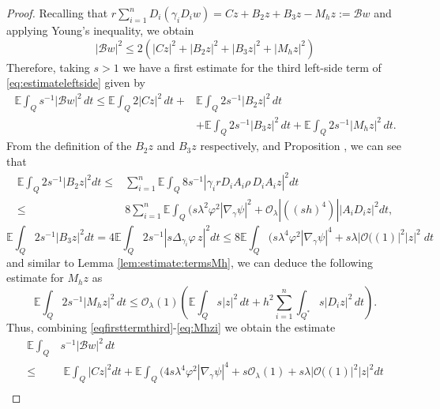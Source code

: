 \documentclass[11pt,oneside,leqno]{amsart}
\numberwithin{equation}{section}
\numberwithin{equation}{section}
\newcommand{\E}{\mathbb{E}}
\begin{document}
\begin{proof}
    Recalling that $\displaystyle r{ \sum_{i=1}^{n}}D_i(\gamma_iD_iw)=Cz+B_2z+B_3z-M_hz:= \mathcal{B}w$ and applying Young's inequality, we obtain
\begin{equation}
    |\mathcal{B}w|^2\leq  2(|Cz|^2+|B_2z|^2+|B_3z|^2+|M_hz|^2)
\end{equation}
Therefore, taking $s>1$ we have a first estimate for the third left-side term of \eqref{eq:estimateleftside} given by
\begin{equation}\label{eqfirsttermthird}
\begin{split}
       \E\int_{Q}s^{-1}|\mathcal{B}w|^2\,dt\leq \E\int_{Q}2|Cz|^2\,dt+&\E\int_{Q}2s^{-1}|B_2z|^2\,dt\\
       &+\E\int_{Q}2s^{-1}|B_3z|^2\,dt+\E\int_{Q}2s^{-1}|M_hz|^2\,dt. 
\end{split} 
\end{equation}
From the definition of the $B_2z$ and $B_3z$ respectively, \cite[Lemma 3.7]{BHLR:2010b} and Proposition {\cite[Proposition 3.3]{AA:perez:2024}}, we can see that
\begin{equation}
\begin{split}
    \E\int_{Q}2s^{-1}|B_2z|^2dt\leq&\sum_{i=1}^{n}\E\int_{Q}8s^{-1}|\gamma_irD_iA_i\rho\, D_iA_iz|^2dt\\
    \leq &8\sum_{i=1}^{n}\E\int_{Q}(s\lambda^2\varphi^2 |\nabla_\gamma\psi|^2+\mathcal{O}_{\lambda}|((sh)^4)||A_iD_iz|^2dt,
\end{split} 
\end{equation}
\begin{equation}
    \E\int_{Q}2s^{-1}|B_3z|^2dt=4\E\int_{Q}2s^{-1}|s\Delta_{\gamma_i}\varphi\, z|^2dt\leq 8\E\int_{Q}(s\lambda^4\varphi^2 |\nabla_\gamma\psi|^4+s\lambda|\mathcal{O}((1)|^2|z|^2\;dt
\end{equation}
and similar to Lemma \ref{lem:estimate:termsMh}, we can deduce the following estimate for $M_hz$ as
\begin{equation} \label{eq:Mhzi}
     \E\int_{Q}2s^{-1}|M_hz|^2\,dt\leq \mathcal{O}_{\lambda}(1)\left(\E\int_{Q}s|z|^2\,dt+h^2\sum_{i=1}^{n}\int_{Q^{\ast}}s|D_iz|^2\,dt\right).
\end{equation}
Thus, combining \eqref{eqfirsttermthird}-\eqref{eq:Mhzi}  we obtain the estimate 
\begin{equation}\label{eq:estimateD2}
    \begin{split}
        \E\int_{Q}&s^{-1}|\mathcal{B}w|^2\,dt\\
        \leq&\; \E\int_{Q}|Cz|^2dt+\E\int_{Q}(4s\lambda^4\varphi^2 |\nabla_\gamma\psi|^4+s\mathcal{O}_{\lambda}(1)+s\lambda|\mathcal{O}((1)|^2|z|^2dt\\

\end{split}
\end{equation}
\end{proof}
\end{document}
